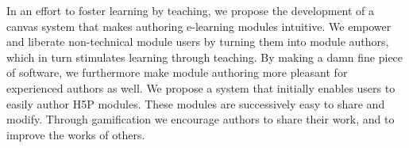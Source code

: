 In an effort to foster learning by teaching, we propose the development of a 
canvas system that makes authoring e-learning modules intuitive. We empower 
and liberate non-technical module users by turning them into module authors, 
which in turn stimulates learning through teaching. By making a damn fine 
piece of software, we furthermore make module authoring more pleasant for 
experienced authors as well. We propose a system that initially enables users 
to easily author H5P modules. These modules are successively easy to share and 
modify. Through gamification we encourage authors to share their work, and to 
improve the works of others.
